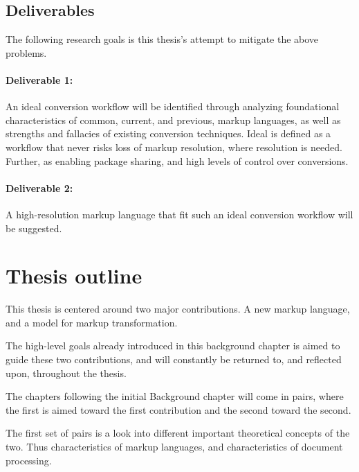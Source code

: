 \documentclass{scrreprt}
\begin{document}
\subsection{Deliverables}
The following research goals is this thesis's attempt to mitigate the above problems.


\paragraph{Deliverable 1:} An ideal conversion workflow will be identified through analyzing foundational characteristics of common, current, and previous, markup languages, as well as strengths and fallacies of existing conversion techniques. Ideal is defined as a workflow that never risks loss of markup resolution, where resolution is needed. Further, as enabling package sharing, and high levels of control over conversions.

\paragraph{Deliverable 2:} A high-resolution markup language that fit such an ideal conversion workflow will be suggested.








\section{Thesis outline}
This thesis is centered around two major contributions. A new markup language, and a model for markup transformation.

The high-level goals already introduced in this background chapter is aimed to guide these two contributions, and will constantly be returned to, and reflected upon, throughout the thesis.

The chapters following the initial Background chapter will come in pairs, where the first is aimed toward the first contribution and the second toward the second.

The first set of pairs is a look into different important theoretical concepts of the two. Thus characteristics of markup languages, and characteristics of document processing.
\end{document}
